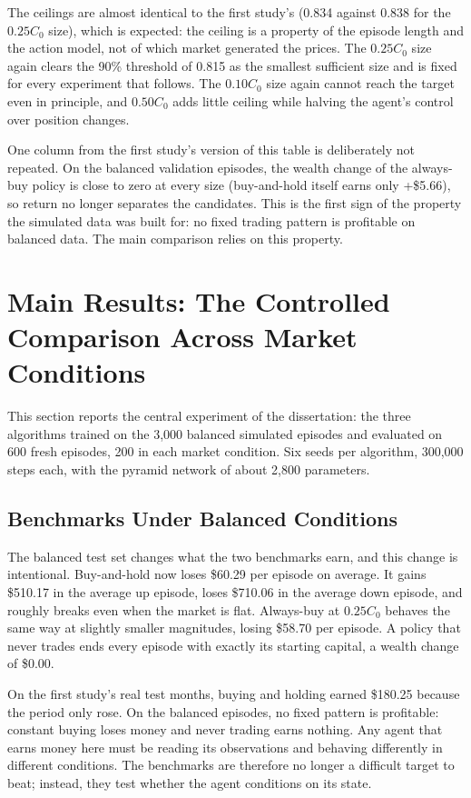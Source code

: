 The ceilings are almost identical to the first study's (0.834 against 0.838
for the \(0.25C_{0}\) size), which is expected: the ceiling is a
property of the episode length and the action model, not of which market
generated the prices. The \(0.25C_{0}\) size again clears the 90\%
threshold of 0.815 as the smallest sufficient size and is fixed for
every experiment that follows. The \(0.10C_{0}\) size again cannot reach
the target even in principle, and \(0.50C_{0}\) adds little ceiling
while halving the agent's control over position changes.

One column from the first study's version of this table is deliberately
not repeated. On the balanced validation episodes, the wealth change of
the always-buy policy is close to zero at every size (buy-and-hold
itself earns only +\$5.66), so return no longer separates the
candidates. This is the first sign of the property the simulated data
was built for: no fixed trading pattern is profitable on balanced data.
The main comparison relies on this property.

\section{Main Results: The Controlled Comparison Across Market
Conditions}

This section reports the central experiment of the dissertation: the
three algorithms trained on the 3,000 balanced simulated episodes and
evaluated on 600 fresh episodes, 200 in each market condition. Six seeds
per algorithm, 300,000 steps each, with the pyramid network of about
2,800 parameters.

\subsection{Benchmarks Under Balanced Conditions}

The balanced test set changes what the two benchmarks earn, and this
change is intentional. Buy-and-hold now loses \$60.29 per
episode on average. It gains \$510.17 in the average up episode, loses
\$710.06 in the average down episode, and roughly breaks even when the
market is flat. Always-buy at \(0.25C_{0}\) behaves the same way at
slightly smaller magnitudes, losing \$58.70 per episode. A policy that
never trades ends every episode with exactly its starting capital, a
wealth change of \$0.00.

On the first study's real test months, buying and holding earned \$180.25
because the period only rose. On the balanced episodes, no fixed pattern
is profitable: constant buying loses money and never trading earns
nothing.
Any agent that earns money here must be reading its observations and
behaving differently in different conditions. The benchmarks are
therefore no longer a difficult target to beat; instead, they test
whether the agent conditions on its state.

